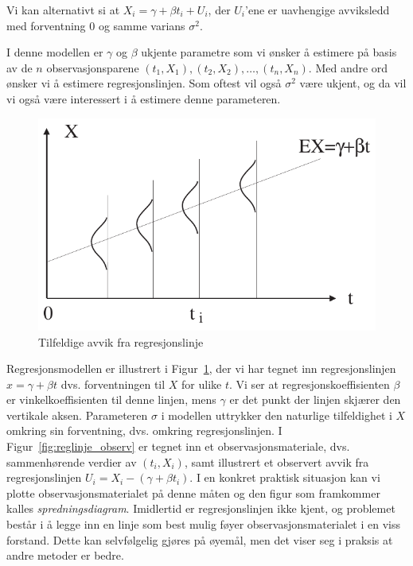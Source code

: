 \begin{center}  \end{center}
Vi kan alternativt si at $X_i=\gamma + \beta t_i + U_i$, der $U_i$'ene er
uavhengige avviksledd med forventning 0 og samme varians $\sigma ^2$.

I denne modellen er $\gamma$ og $\beta$ ukjente parametre som vi
ønsker å estimere  på basis av de $n$
observasjonsparene $(t_1,X_1),(t_2,X_2),\ldots ,(t_n,X_n)$.
Med andre ord ønsker vi å estimere regresjonslinjen.
Som oftest vil også $\sigma ^2$ være ukjent, og da vil vi
også være interessert i å estimere denne parameteren.


\begin{figure}[ht]
\centering
  \includegraphics[scale=0.8]{figurer/fig8_3.pdf} 
 \caption{Tilfeldige avvik fra regresjonslinje}
	\label{fig:regresjonslinje}
\end{figure}
Regresjonsmodellen er illustrert i Figur~\ref{fig:regresjonslinje}, der vi har
tegnet inn regresjonslinjen $x=\gamma + \beta t$
dvs. forventningen til $X$ for ulike $t$. Vi ser at
regresjonskoeffisienten $\beta$ er vinkelkoeffisienten til denne
linjen, mens $\gamma$ er det punkt der linjen skjærer den
vertikale aksen. Parameteren $\sigma$ i modellen uttrykker den
naturlige tilfeldighet i $X$ omkring sin forventning, dvs. omkring
regresjonslinjen. I Figur~\ref{fig:reglinje_observ} er tegnet inn et observasjonsmateriale,
dvs. sammenhørende verdier av $(t_i,X_i)$, samt illustrert et
observert avvik fra regresjonslinjen $U_i = X_i-(\gamma + \beta t_i)$.
I en konkret praktisk situasjon kan vi plotte
observasjonsmaterialet på denne måten og den figur som
framkommer kalles {\em spredningsdiagram}. Imidlertid er
regresjonslinjen ikke kjent, og problemet består i å
legge inn en linje som best mulig føyer observasjonsmaterialet
i en viss forstand. Dette kan selvfølgelig gjøres på
øyemål, men det viser seg i praksis at andre metoder er
bedre.

